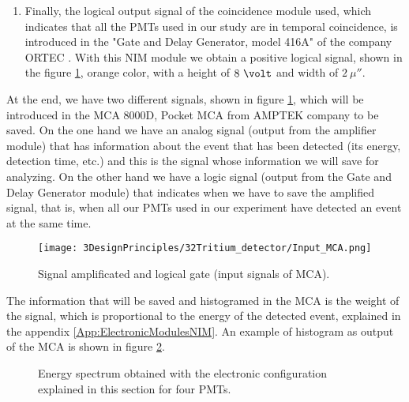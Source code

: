 \begin{itemize}
\begin{enumerate}
\begin{enumerate}
\end{enumerate}

\item{} Finally, the logical output signal of the coincidence module used, which indicates that all the PMTs used in our study are in temporal coincidence, is introduced in the "Gate and Delay Generator, model 416A" of the company ORTEC \cite{DataSheetGateAndDelay}. With this NIM module we obtain a positive logical signal, shown in the figure \ref{fig:InputSignalsMCA}, orange color, with a height of $8~\volt$ and width of $2~\mu\second$.

\end{enumerate}

\end{itemize}

At the end, we have two different signals, shown in figure \ref{fig:InputSignalsMCA}, which will be introduced in the MCA 8000D, Pocket MCA from AMPTEK company \cite{DataSheetMCA} to be saved. On the one hand we have an analog signal (output from the amplifier module) that has information about the event that has been detected (its energy, detection time, etc.) and this is the signal whose information we will save for analyzing. On the other hand we have a logic signal (output from the Gate and Delay Generator module) that indicates when we have to save the amplified signal, that is, when all our PMTs used in our experiment have detected an event at the same time.

\begin{figure}[htbp]
\centering
\texttt{[image: 3DesignPrinciples/32Tritium\_detector/Input\_MCA.png]}
\caption{Signal amplificated and logical gate (input signals of MCA).\label{fig:InputSignalsMCA}}
\end{figure}


The information that will be saved and histogramed in the MCA is the weight of the signal, which is proportional to the energy of the detected event, explained in the appendix \ref{App:ElectronicModulesNIM}. An example of histogram as output of the MCA is shown in figure \ref{fig:EnergySpectrum4PMTs}.

\begin{figure}[htbp]
\centering
\caption{Energy spectrum obtained with the electronic configuration explained in this section for four PMTs.\label{fig:EnergySpectrum4PMTs}}
\end{figure}
